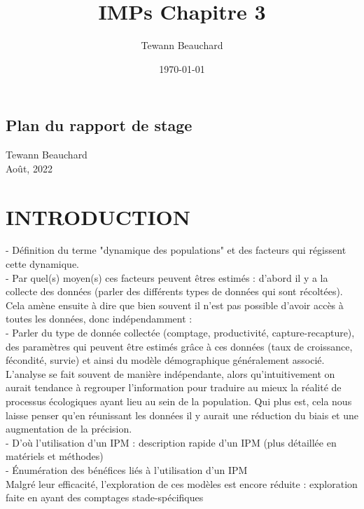 \documentclass[12pt,a4paper]{article}
\title{IMPs Chapitre 3}
\date{\today}
\author{Tewann Beauchard}
\begin{document}
\begin{center}
\section*{Plan du rapport de stage}
\vspace*{1cm}
Tewann Beauchard \\
\vspace*{1cm}
Août, 2022
\end{center}
\vspace*{1cm}
\section{INTRODUCTION}
- Définition du terme "dynamique des populations" et des facteurs qui régissent cette dynamique.\\

- Par quel(s) moyen(s) ces facteurs peuvent êtres estimés : d'abord il y a la collecte des données (parler des différents types de données qui sont récoltées).\\


Cela amène ensuite à dire que bien souvent il n'est pas possible d'avoir accès à toutes les données, donc indépendamment : \\

- Parler du type de donnée collectée (comptage, productivité, capture-recapture), des paramètres qui peuvent être estimés grâce à ces données (taux de croissance, fécondité, survie) et ainsi du modèle démographique généralement associé.\\


L'analyse se fait souvent de manière indépendante, alors qu'intuitivement on aurait tendance à regrouper l'information pour traduire au mieux la réalité de processus écologiques ayant lieu au sein de la population. Qui plus est, cela nous laisse penser qu'en réunissant les données il y aurait une réduction du biais et une augmentation de la précision.\\

- D'où l'utilisation d'un IPM : description rapide d'un IPM (plus détaillée en matériels et méthodes)\\

- Énumération des bénéfices liés à l'utilisation d'un IPM\\


Malgré leur efficacité, l'exploration de ces modèles est encore réduite : exploration faite en ayant des comptages stade-spécifiques\\
\end{document}
